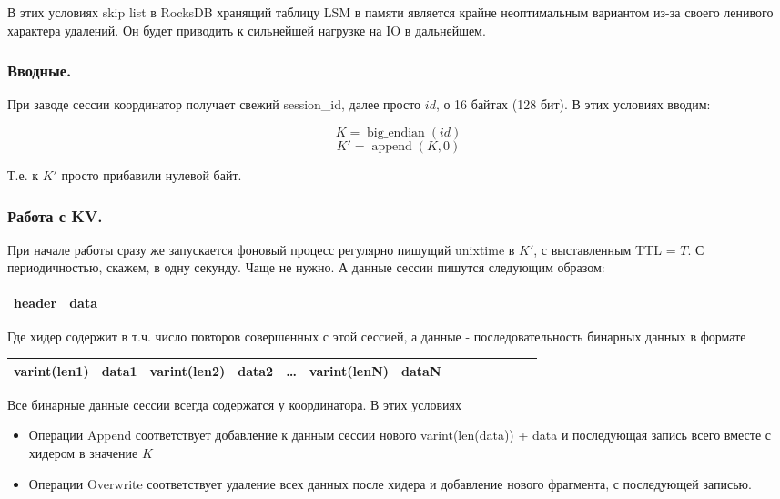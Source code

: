 \documentclass[a4paper,12pt]{article}
\begin{document}
    В этих условиях skip list в RocksDB хранящий таблицу LSM в памяти является крайне неоптимальным вариантом из-за своего
    ленивого характера удалений. Он будет приводить к сильнейшей нагрузке на IO в дальнейшем.

    \subsubsection{Вводные.}

    При заводе сессии координатор получает свежий session\_id, далее просто $id$, о 16 байтах (128 бит). В этих условиях вводим:

    $$K=\operatorname{big\_endian}(id)$$
    $$K'=\operatorname{append}(K, 0)$$

    Т.е. к $K'$ просто прибавили нулевой байт.

    \subsubsection{Работа с KV.}

    При начале работы сразу же запускается фоновый процесс регулярно пишущий unixtime в $K'$, с выставленным TTL = $T$. С периодичностью, скажем,
    в одну секунду. Чаще не нужно. А данные сессии пишутся следующим образом:

    \begin{center}
        \begin{tabular}{|Sl|Sr|}
            \hline
            header & data \\
            \hline
        \end{tabular}
    \end{center}

    Где хидер содержит в т.ч. число повторов совершенных с этой сессией, а данные - последовательность бинарных данных в формате

    \begin{center}
        \begin{tabular}{|Sl|Sc|Sc|Sc|Sc|Sc|Sr|}
            \hline
            varint(len1) & data1 & varint(len2) & data2 & \dots & varint(lenN) & dataN \\
            \hline
        \end{tabular}
    \end{center}

    Все бинарные данные сессии всегда содержатся у координатора. В этих условиях

    \begin{itemize}
        \item Операции Append соответствует добавление к данным сессии нового varint(len(data)) + data и последующая запись всего вместе с
        хидером в значение $K$
        \item Операции Overwrite соответствует удаление всех данных после хидера и добавление нового фрагмента, с последующей записью.
    \end{itemize}
\end{document}
